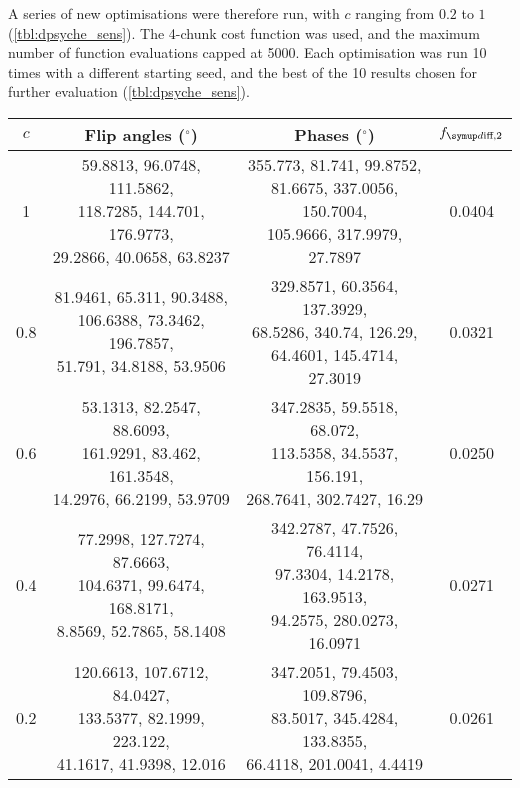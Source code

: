 A series of new optimisations were therefore run, with $c$ ranging from $0.2$ to $1$ (\cref{tbl:dpsyche_sens}).
The 4-chunk cost function was used, and the maximum number of function evaluations capped at 5000.
Each optimisation was run 10 times with a different starting seed, and the best of the 10 results chosen for further evaluation (\cref{tbl:dpsyche_sens}).

\begin{table}[htb]
    \begin{tabular}{cccc}
        \toprule
        $c$ & \textbf{Flip angles} ($^\circ$) & \textbf{Phases} ($^\circ$) & $\fdifftwo$ \\
        \midrule
        1 & \makecell{59.8813, 96.0748, 111.5862, \\ 118.7285, 144.701, 176.9773, \\ 29.2866, 40.0658, 63.8237} & \makecell{355.773, 81.741, 99.8752, \\ 81.6675, 337.0056, 150.7004, \\ 105.9666, 317.9979, 27.7897} & 0.0404 \\
        \midrule
        0.8 & \makecell{81.9461, 65.311, 90.3488, \\ 106.6388, 73.3462, 196.7857, \\ 51.791, 34.8188, 53.9506} & \makecell{329.8571, 60.3564, 137.3929, \\ 68.5286, 340.74, 126.29, \\ 64.4601, 145.4714, 27.3019} & 0.0321 \\
        \midrule
        0.6 & \makecell{53.1313, 82.2547, 88.6093, \\ 161.9291, 83.462, 161.3548, \\ 14.2976, 66.2199, 53.9709} & \makecell{347.2835, 59.5518, 68.072, \\ 113.5358, 34.5537, 156.191, \\ 268.7641, 302.7427, 16.29} & 0.0250 \\
        \midrule
        0.4 & \makecell{77.2998, 127.7274, 87.6663, \\ 104.6371, 99.6474, 168.8171, \\ 8.8569, 52.7865, 58.1408} & \makecell{342.2787, 47.7526, 76.4114, \\ 97.3304, 14.2178, 163.9513, \\ 94.2575, 280.0273, 16.0971} & 0.0271 \\
        \midrule
        0.2 & \makecell{120.6613, 107.6712, 84.0427, \\ 133.5377, 82.1999, 223.122, \\ 41.1617, 41.9398, 12.016} & \makecell{347.2051, 79.4503, 109.8796, \\ 83.5017, 345.4284, 133.8355, \\ 66.4118, 201.0041, 4.4419} & 0.0261 \\

\end{tabular}
\end{table}
